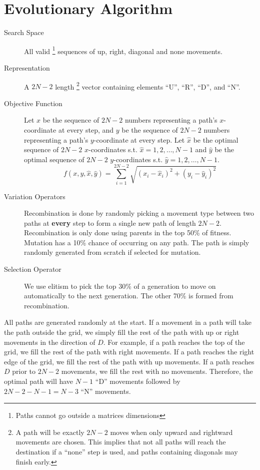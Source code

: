 
\section{Evolutionary Algorithm}

\begin{description}
    \item[Search Space] All valid \footnote{Paths cannot go outside a matrices dimensions} sequences of up, right, diagonal and none movements.
    \item[Representation] A $2N - 2$ length \footnote{A path will be exactly $2N - 2$ moves when only upward and rightward movements are chosen. This implies that not all paths will reach the destination if a ``none'' step is used, and paths containing diagonals may finish early.} vector containing elements ``U'', ``R'', ``D'', and ``N''.
    \item[Objective Function] Let $x$ be the sequence of $2N - 2$ numbers representing a path's $x$-coordinate at every step, and $y$ be the sequence of $2N - 2$ numbers representing a path's $y$-coordinate at every step. Let $\hat{x}$ be the optimal sequence of $2N - 2$ $x$-coordinates s.t. $\hat{x} = 1,2,\dots,N-1$ and $\hat{y}$ be the optimal sequence of $2N - 2$ $y$-coordinates s.t. $\hat{y} = 1,2,\dots,N-1$.
    \begin{equation*}
        f(x, y, \hat{x}, \hat{y}) = \sum_{i=1}^{2N-2} \sqrt{(x_{i} - \hat{x}_{i})^2 + (y_i - \hat{y}_{i})^2}
    \end{equation*}
    \item[Variation Operators] Recombination is done by randomly picking a movement type between two paths at \textbf{every} step to form a single new path of length $2N-2$. Recombination is only done using parents in the top 50\% of fitness. Mutation has a 10\% chance of occurring on any path. The path is simply randomly generated from scratch if selected for mutation.
    \item[Selection Operator] We use elitism to pick the top 30\% of a generation to move on automatically to the next generation. The other 70\% is formed from recombination.
\end{description}

All paths are generated randomly at the start. If a movement in a path will take the path outside the grid, we simply fill the rest of the path with up or right movements in the direction of $D$. For example, if a path reaches the top of the grid, we fill the rest of the path with right movements. If a path reaches the right edge of the grid, we fill the rest of the path with up movements. If a path reaches $D$ prior to $2N-2$ movements, we fill the rest with no movements. Therefore, the optimal path will have $N-1$ ``D'' movements followed by $2N-2-N-1=N-3$ ``N'' movements.
